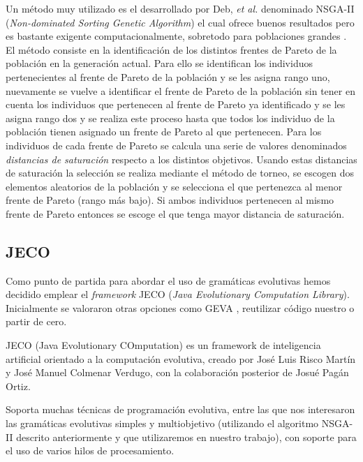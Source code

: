 Un método muy utilizado es el desarrollado por Deb, \textit{et al.} denominado NSGA-II (\textit{Non-dominated Sorting Genetic Algorithm}) el cual ofrece buenos resultados pero es bastante exigente computacionalmente, sobretodo para poblaciones grandes \cite{deb2002fast}. El método consiste en la identificación de los distintos frentes de Pareto de la población en la generación actual. Para ello se identifican los individuos pertenecientes al frente de Pareto de la población y se les asigna rango uno, nuevamente se vuelve a identificar el frente de Pareto de la población sin tener en cuenta los individuos que pertenecen al frente de Pareto ya identificado y se les asigna rango dos y se realiza este proceso hasta que todos los individuo de la población tienen asignado un frente de Pareto al que pertenecen. Para los individuos de cada frente de Pareto se calcula una serie de valores denominados \textit{distancias de saturación} respecto a los distintos objetivos. Usando estas distancias de saturación la selección se realiza mediante el método de torneo, se escogen dos elementos aleatorios de la población y se selecciona el que pertenezca al menor frente de Pareto (rango más bajo). Si ambos individuos pertenecen al mismo frente de Pareto entonces se escoge el que tenga mayor distancia de saturación.

\subsection{JECO}
Como punto de partida para abordar el uso de gramáticas evolutivas hemos decidido emplear el \textit{framework} JECO \cite{jecoGit} (\textit{Java Evolutionary Computation Library}). Inicialmente se valoraron otras opciones como  GEVA \cite{gevaGit}, reutilizar código nuestro o partir de cero.

JECO (Java Evolutionary COmputation) es un framework de inteligencia artificial orientado a la computación evolutiva, creado por José Luis Risco Martín y José Manuel Colmenar Verdugo, con la colaboración posterior de Josué Pagán Ortiz.

Soporta muchas técnicas de programación evolutiva, entre las que nos interesaron las gramáticas evolutivas simples y multiobjetivo (utilizando el algoritmo NSGA-II descrito anteriormente y que utilizaremos en nuestro trabajo), con soporte para el uso de varios hilos de procesamiento.
